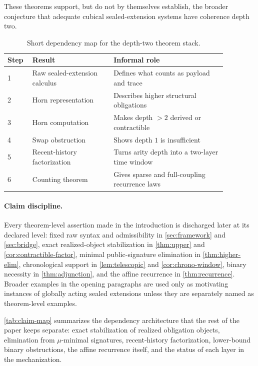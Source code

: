 \documentclass{lmcs}
\begin{document}
These theorems support, but do not by themselves establish, the broader conjecture that adequate cubical sealed-extension systems have coherence depth two.

\begin{table}[t]
\centering
\caption{Short dependency map for the depth-two theorem stack.}
\label{tab:intro-dependency}
\small
\begin{tabular}{@{}p{0.08\linewidth}p{0.33\linewidth}p{0.46\linewidth}@{}}
\toprule
Step & Result & Informal role \\
\midrule
1 & Raw sealed-extension calculus & Defines what counts as payload and trace \\
2 & Horn representation & Describes higher structural obligations \\
3 & Horn computation & Makes depth $>2$ derived or contractible \\
4 & Swap obstruction & Shows depth $1$ is insufficient \\
5 & Recent-history factorization & Turns arity depth into a two-layer time window \\
6 & Counting theorem & Gives sparse and full-coupling recurrence laws \\
\bottomrule
\end{tabular}
\end{table}

\paragraph{Claim discipline.}
Every theorem-level assertion made in the introduction is discharged later at
its declared level: fixed raw syntax and admissibility in
\autoref{sec:framework} and \autoref{sec:bridge}, exact realized-object
stabilization in \autoref{thm:upper} and \autoref{cor:contractible-factor},
minimal public-signature elimination in \autoref{thm:higher-elim}, chronological
support in \autoref{lem:telescopic} and \autoref{cor:chrono-window}, binary
necessity in \autoref{thm:adjunction}, and the affine recurrence in
\autoref{thm:recurrence}. Broader examples in the opening paragraphs are used
only as motivating instances of globally acting sealed extensions unless they
are separately named as theorem-level examples.

\autoref{tab:claim-map} summarizes the dependency architecture that the rest of the paper keeps separate: exact stabilization of realized obligation objects, elimination from $\mu$-minimal signatures, recent-history factorization, lower-bound binary obstructions, the affine recurrence itself, and the status of each layer in the mechanization.
\end{document}
